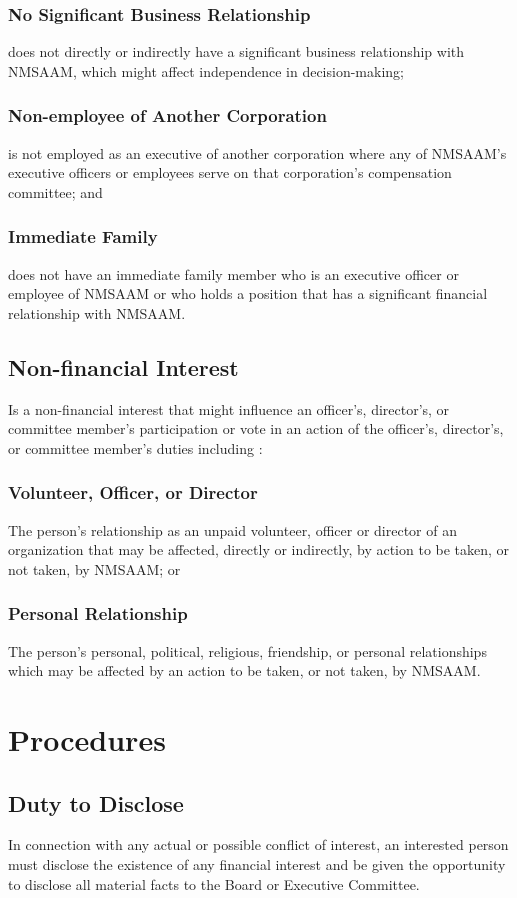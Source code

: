 \documentclass[letterpaper,12pt]{article}
\begin{document}
\subsubsection{No Significant Business Relationship}
\label{sec:orgd646fa9}
does not directly or indirectly have a significant business
relationship with NMSAAM, which might affect independence in
decision-making;
\subsubsection{Non-employee of Another Corporation}
\label{sec:org456bc52}
is not employed as an executive of another corporation where any
of NMSAAM’s executive officers or employees serve on that
corporation’s compensation committee; and
\subsubsection{Immediate Family}
\label{sec:orgcae085d}
does not have an immediate family member who is an executive
officer or employee of NMSAAM or who holds a position that has a
significant financial relationship with NMSAAM.
\subsection{Non-financial Interest}
\label{sec:orgf22be68}
Is a non-financial interest that might influence an officer’s,
director’s, or committee member’s participation or vote in an
action of the officer’s, director’s, or committee member’s duties
including :
\subsubsection{Volunteer, Officer, or Director}
\label{sec:org57d8382}
The person’s relationship as an unpaid volunteer, officer or
director of an organization that may be affected, directly or
indirectly, by action to be taken, or not taken, by NMSAAM; or
\subsubsection{Personal Relationship}
\label{sec:orgc642efd}
The person’s personal, political, religious, friendship, or
personal relationships which may be affected by an action to be
taken, or not taken, by NMSAAM.
\section{Procedures}
\label{sec:org79ec4ca}
\subsection{Duty to Disclose}
\label{sec:org14f5be3}
In connection with any actual or possible conflict of interest, an
interested person must disclose the existence of any financial
interest and be given the opportunity to disclose all material
facts to the Board or Executive Committee.
\end{document}

